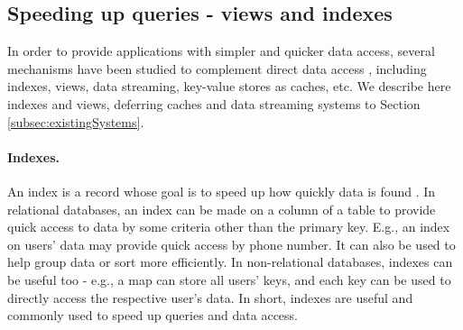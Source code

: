 


\subsection{Speeding up queries - views and indexes}
\label{subsec:views}

In order to provide applications with simpler and quicker data access, several mechanisms have been studied to complement direct data access \cite{noria, dbtoaster, pequod, txcache, viewSelection, optIncMaintenance, effMaintenance, lazyMaintenance, lisa, bp-tree, bindex, dbproxy}, including indexes, views, data streaming, key-value stores as caches, etc.
We describe here indexes and views, deferring caches and data streaming systems to Section \ref{subsec:existingSystems}.


\paragraph{Indexes.}
An index is a record whose goal is to speed up how quickly data is found \cite{bp-tree, mongoVScassandra, lisa}.
In relational databases, an index can be made on a column of a table to provide quick access to data by some criteria other than the primary key.
E.g., an index on users' data may provide quick access by phone number.
It can also be used to help group data or sort more efficiently.
In non-relational databases, indexes can be useful too - e.g., a map can store all users' keys, and each key can be used to directly 
access the respective user's data.
In short, indexes are useful and commonly used to speed up queries and data access.


